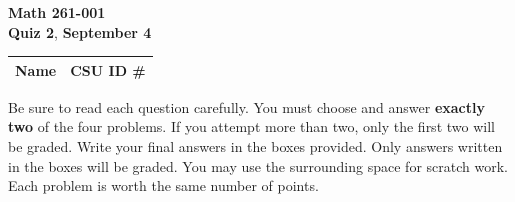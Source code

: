 \documentclass[12pt]{exam}
\newcommand{\class}{Math 261-001}
\newcommand{\examnum}{Quiz 2}
\newcommand{\examdate}{September 4}
\begin{document}
\pagestyle{plain}
\thispagestyle{empty}

\noindent
\textbf{\class}\\
\textbf{\examnum}, \textbf{\examdate} \\

\setlength{\tabcolsep}{3.5cm}
\renewcommand{\arraystretch}{1.5}
\setlength\extrarowheight{1cm}
\begin{tabular}{ |c|c| }
 \hline
 Name   & CSU ID \#  \\
 \hline
\end{tabular}

\vspace{10pt}

Be sure to read each question carefully. You must choose and answer
\textbf{exactly two} of the four problems. If you attempt more than two, only
the first two will be graded. Write your final answers in the boxes provided.
Only answers written in the boxes will be graded. You may use the surrounding
space for scratch work. Each problem is worth the same number of points.
\end{document}
